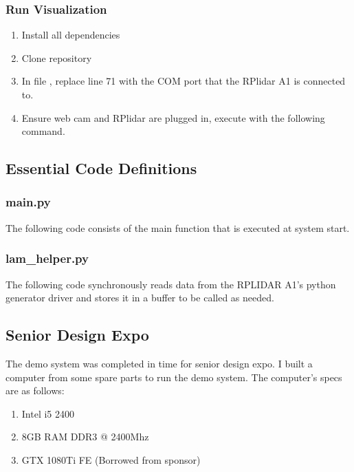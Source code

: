 \documentclass[onecolumn, draftclsnofoot,10pt, compsoc]{IEEEtran}
\begin{document}
\begin{singlespace}
		\subsubsection{Run Visualization}
		\begin{enumerate}
			\item Install all dependencies
			\item Clone repository
				\subitem {}
			\item In file , replace line 71  with the COM port that the RPlidar A1 is connected to.
			\item Ensure web cam and RPlidar are plugged in, execute with the following command.
				\subitem {}
		\end{enumerate}

	\clearpage

\subsection{Essential Code Definitions}
\lstset{breaklines=true}
\subsubsection{main.py}
The following code consists of the main function that is executed at system start.


\clearpage

\subsubsection{lam\_helper.py}
The following code synchronously reads data from the RPLIDAR A1's python generator driver and stores it in a buffer to be called as needed.

\clearpage

\subsection{Senior Design Expo}
	The demo system was completed in time for senior design expo. 
	I built a computer from some spare parts to run the demo system.
	The computer's specs are as follows:
	

	\begin{enumerate}
	\item Intel i5 2400
	\item 8GB RAM DDR3 @ 2400Mhz
	\item GTX 1080Ti FE (Borrowed from sponsor)
	\end{enumerate}
	


\end{singlespace}
\end{document}
